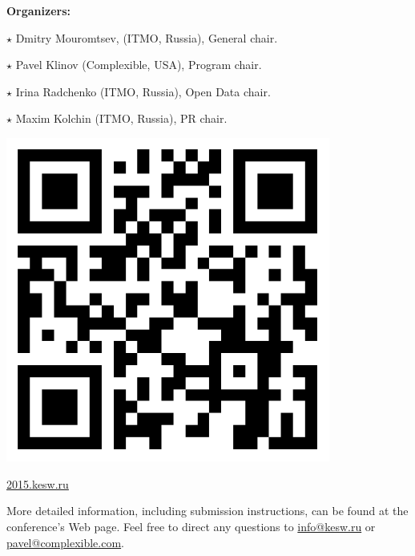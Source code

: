 \documentclass[a4paper, 10pt]{article}
\renewcommand{\skip}{\vspace{1ex}}
\renewcommand{\bullet}{\ensuremath{\star} }
\begin{document}
\hspace*{-\parindent}%
\begin{minipage}{.80\textwidth}

\textbf{Organizers:}

\skip

\noindent
\bullet Dmitry Mouromtsev, (ITMO, Russia), General chair.

\bullet Pavel Klinov (Complexible, USA), Program chair.

\bullet Irina Radchenko (ITMO, Russia), Open Data chair. 

\bullet Maxim Kolchin (ITMO, Russia), PR chair.

\end{minipage}
\begin{minipage}{.20\textwidth}
\includegraphics[width=0.8\textwidth]{qrcode}

\footnotesize{\url{2015.kesw.ru}}
\end{minipage}
\hfill


\vfill

\noindent More detailed information, including submission instructions, can be
found at the conference's Web page. Feel free to direct any questions to
\url{info@kesw.ru} or \url{pavel@complexible.com}.


\end{document}
